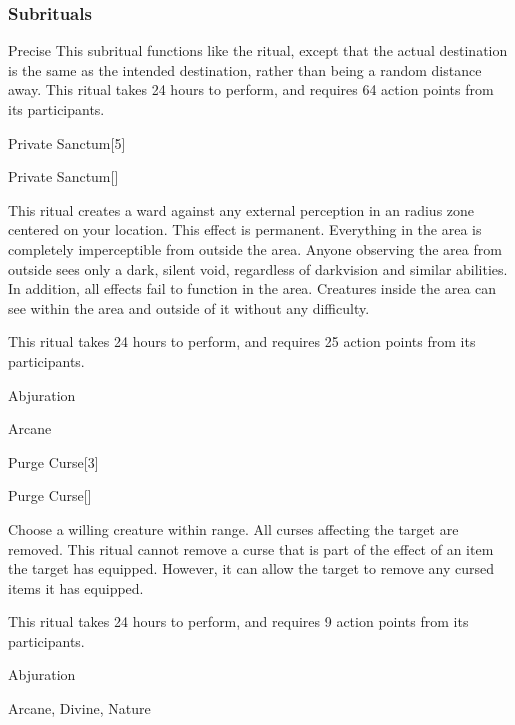 \subsubsection{Subrituals}


\begin{ability}[\nth{8}]{Precise}
This subritual functions like the  ritual, except that the actual destination is the same as the intended destination, rather than being a random distance away.
This ritual takes 24 hours to perform, and requires 64 action points from its participants.
\end{ability}
\vspace{0.25em}


\begin{spellsection}{Private Sanctum}[5]


\begin{ability}{Private Sanctum}[]

This ritual creates a ward against any external perception in an \arealarge radius zone centered on your location.
This effect is permanent.
Everything in the area is completely imperceptible from outside the area.
Anyone observing the area from outside sees only a dark, silent void, regardless of darkvision and similar abilities.
In addition, all  effects fail to function in the area.
Creatures inside the area can see within the area and outside of it without any difficulty.

This ritual takes 24 hours to perform, and requires 25 action points from its participants.

\end{ability}




 Abjuration

 Arcane
\end{spellsection}


\begin{spellsection}{Purge Curse}[3]


\begin{ability}{Purge Curse}[]

Choose a willing creature within \rngclose range.
All curses affecting the target are removed.
This ritual cannot remove a curse that is part of the effect of an item the target has equipped.
However, it can allow the target to remove any cursed items it has equipped.

This ritual takes 24 hours to perform, and requires 9 action points from its participants.

\end{ability}




 Abjuration

 Arcane, Divine, Nature
\end{spellsection}


